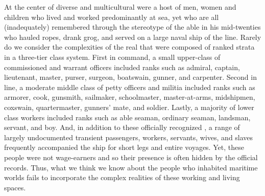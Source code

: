 At the center of diverse and multicultural  were a host of men, women and children who lived and worked predominantly at sea, yet who are all (inadequately) remembered through the stereotype of the able  in his mid-twenties who hauled ropes, drank grog, and served on a large naval ship of the line. Rarely do we consider the complexities of the real  that were composed of ranked strata in a three-tier class system. First in command, a small upper-class of commissioned and warrant officers included ranks such as admiral, captain, lieutenant, master, purser, surgeon, boatswain, gunner, and carpenter. Second in line, a moderate middle class of petty officers and militia included ranks such as armorer, cook, gunsmith, sailmaker, schoolmaster, master-at-arms, midshipmen, coxswain, quartermaster, gunners’ mate, and soldier. Lastly, a majority of lower class workers included ranks such as able seaman, ordinary seaman, landsman, servant, and boy. And, in addition to these officially recognized , a range of largely undocumented transient passengers, workers, servants, wives, and slaves frequently accompanied the ship for short legs and entire voyages. Yet, these people were not wage-earners and so their presence is often hidden by the official records. Thus, what we think we know about the people who inhabited maritime worlds fails to incorporate the complex realities of these working and living spaces.  



